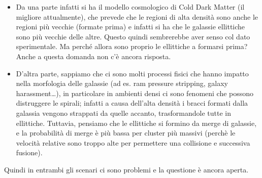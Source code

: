 \begin{itemize}
	\item Da una parte infatti si ha il modello cosmologico di Cold Dark Matter (il migliore attualmente), che prevede che le regioni di alta densità sono anche le regioni più vecchie (formate prima) e infatti si ha che le galassie ellittiche sono più vecchie delle altre. Questo quindi sembrerebbe aver senso col dato sperimentale. Ma perché allora sono proprio le ellittiche a formarsi prima? Anche a questa domanda non c’è ancora risposta.
	\item D’altra parte, sappiamo che ci sono molti processi fisici che hanno impatto nella morfologia delle galassie (ad es. ram pressure stripping, galaxy harassment…), in particolare in ambienti densi ci sono fenomeni che possono distruggere le spirali; infatti a causa dell'alta densità i bracci formati dalla galassia vengono strappati da quelle accanto, trasformandole tutte in ellittiche. Tuttavia, pensiamo che le ellittiche si formino da merge di galassie, e la probabilità di merge è più bassa per cluster più massivi (perchè le velocità relative sono troppo alte per permettere una collisione e successiva fusione).
\end{itemize}

Quindi in entrambi gli scenari ci sono problemi e la questione è ancora aperta.